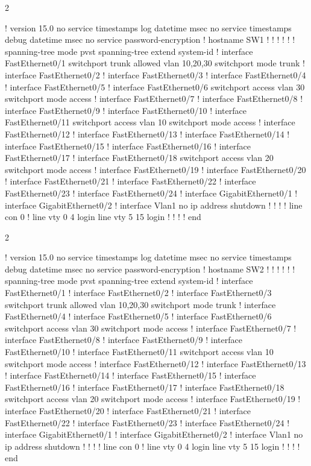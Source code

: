 
\begin{multicols}{2}
\begin{conf}
!
version 15.0
no service timestamps log datetime msec
no service timestamps debug datetime msec
no service password-encryption
!
hostname SW1
!
!
!
!
!
!
spanning-tree mode pvst
spanning-tree extend system-id
!
interface FastEthernet0/1
 switchport trunk allowed vlan 10,20,30
 switchport mode trunk
!
interface FastEthernet0/2
!
interface FastEthernet0/3
!
interface FastEthernet0/4
!
interface FastEthernet0/5
!
interface FastEthernet0/6
 switchport access vlan 30
 switchport mode access
!
interface FastEthernet0/7
!
interface FastEthernet0/8
!
interface FastEthernet0/9
!
interface FastEthernet0/10
!
interface FastEthernet0/11
 switchport access vlan 10
 switchport mode access
!
interface FastEthernet0/12
!
interface FastEthernet0/13
!
interface FastEthernet0/14
!
interface FastEthernet0/15
!
interface FastEthernet0/16
!
interface FastEthernet0/17
!
interface FastEthernet0/18
 switchport access vlan 20
 switchport mode access
!
interface FastEthernet0/19
!
interface FastEthernet0/20
!
interface FastEthernet0/21
!
interface FastEthernet0/22
!
interface FastEthernet0/23
!
interface FastEthernet0/24
!
interface GigabitEthernet0/1
!
interface GigabitEthernet0/2
!
interface Vlan1
 no ip address
 shutdown
!
!
!
!
line con 0
!
line vty 0 4
 login
line vty 5 15
 login
!
!
!
!
end
\end{conf}
\end{multicols}

\clearpage
{}

\begin{multicols}{2}
\begin{conf}
!
version 15.0
no service timestamps log datetime msec
no service timestamps debug datetime msec
no service password-encryption
!
hostname SW2
!
!
!
!
!
!
spanning-tree mode pvst
spanning-tree extend system-id
!
interface FastEthernet0/1
!
interface FastEthernet0/2
!
interface FastEthernet0/3
 switchport trunk allowed vlan 10,20,30
 switchport mode trunk
!
interface FastEthernet0/4
!
interface FastEthernet0/5
!
interface FastEthernet0/6
 switchport access vlan 30
 switchport mode access
!
interface FastEthernet0/7
!
interface FastEthernet0/8
!
interface FastEthernet0/9
!
interface FastEthernet0/10
!
interface FastEthernet0/11
 switchport access vlan 10
 switchport mode access
!
interface FastEthernet0/12
!
interface FastEthernet0/13
!
interface FastEthernet0/14
!
interface FastEthernet0/15
!
interface FastEthernet0/16
!
interface FastEthernet0/17
!
interface FastEthernet0/18
 switchport access vlan 20
 switchport mode access
!
interface FastEthernet0/19
!
interface FastEthernet0/20
!
interface FastEthernet0/21
!
interface FastEthernet0/22
!
interface FastEthernet0/23
!
interface FastEthernet0/24
!
interface GigabitEthernet0/1
!
interface GigabitEthernet0/2
!
interface Vlan1
 no ip address
 shutdown
!
!
!
!
line con 0
!
line vty 0 4
 login
line vty 5 15
 login
!
!
!
!
end
\end{conf}
\end{multicols}

